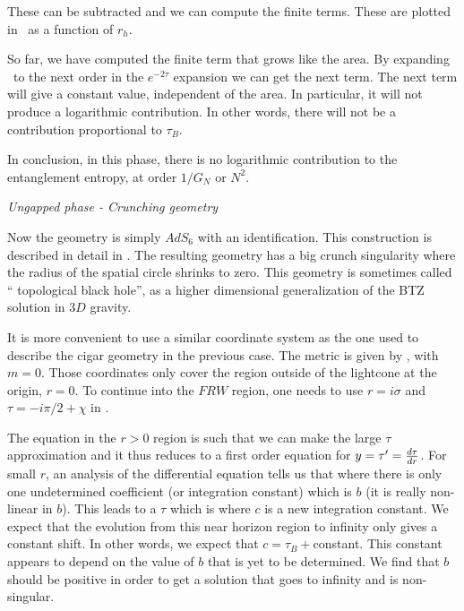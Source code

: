 These can be subtracted and we can compute the finite terms. These are plotted in \plotone\ as a function
of $r_h$.

So far, we have computed the finite term that grows like the area. By expanding \func\ to the next order
in the $e^{ - 2 \tau}$ expansion we can get the next term. The next term will give a constant value,
independent of the area. In particular, it will not produce a logarithmic contribution. In other words,
there will not be a contribution proportional to $\tau_B$.

In conclusion, in this phase, there is no logarithmic contribution to the entanglement entropy, at order
$1/G_N$ or $N^2$.

{\it Ungapped  phase - Crunching geometry}



Now the geometry is simply  $AdS_6$ with an identification.
 This construction is described in detail in .
  The resulting geometry has a big crunch singularity where the radius of the spatial circle shrinks to zero.
  This geometry is sometimes called `` topological black hole'', as a higher dimensional generalization of the BTZ solution in $3D$ gravity.

It is more convenient to use a similar coordinate system as the one used to describe the cigar geometry in the previous case. The metric is given by \cigar , with $m=0$. Those coordinates only cover the region outside of the lightcone at the origin,   $r= 0$. To continue into the $FRW$ region, one needs to use $r = i \sigma $ and $\tau=-i \pi/2 + \chi$ in \cigar .

The equation in the $r>0$ region is such that we can make the large $\tau $ approximation and
it thus reduces to a first order equation for $y = \tau' = { d \tau \over dr }$.
For small $r$, an analysis of the differential equation tells us that
\eqn{}
where there is only one undetermined coefficient (or integration constant) which is $b$ (it is really non-linear in $b$). This leads to
a $\tau$ which is
\eqn{}
where $c$ is a new integration constant. We expect that the evolution from this near horizon region to infinity
only gives a constant shift. In other words, we expect that $c = \tau_B + $constant.
 This constant
appears to depend on the value of $b$ that is yet to be determined.
We find that $b$ should
 be positive in order to get a solution that goes to infinity and is non-singular.

